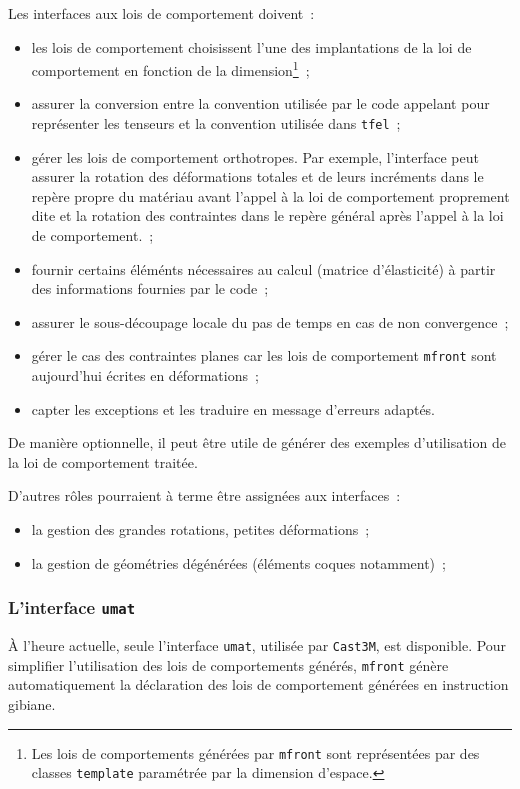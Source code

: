 \documentclass[rectoverso,pleiades,pstricks,leqno,anti]{texmf/note_technique_2010}
\newcommand{\tfel}{\texttt{tfel}}
\newcommand{\mfront}{\texttt{mfront}}
\newcommand{\castem}{\texttt{Cast3M}}
\def\ifmonospace{\ifdim\fontdimen3\font=0pt }
\def\cpp{%
\ifmonospace%
    C++%
\else%
    C\kern-.1667em\raise.30ex\hbox{\smaller{++}}%
\fi%
\spacefactor1000 }
\begin{document}
Les interfaces aux lois de comportement doivent~:
\begin{itemize}
  \item les lois de comportement choisissent l'une des implantations de
  la loi de comportement en fonction de la dimension\footnote{Les lois
    de comportements générées par \mfront{} sont représentées par des
    classes \texttt{template} paramétrée par la dimension d'espace.}~;
  \item assurer la conversion entre la convention utilisée par le code
  appelant pour représenter les tenseurs et la convention utilisée dans
  \tfel{}~;
  \item gérer les lois de comportement orthotropes. Par exemple,
  l'interface peut assurer la rotation des déformations totales et de
  leurs incréments dans le repère propre du matériau avant l'appel à la
  loi de comportement proprement dite et la rotation des contraintes
  dans le repère général après l'appel à la loi de comportement.~;
  \item fournir certains éléménts nécessaires au calcul (matrice
  d'élasticité) à partir des informations fournies par le code~;
  \item assurer le sous-découpage locale du pas de temps en cas de non
  convergence~;
  \item gérer le cas des contraintes planes car les lois de comportement
  \mfront{} sont aujourd'hui écrites en déformations~;
  \item capter les exceptions \cpp{} et les traduire en message
  d'erreurs adaptés.
\end{itemize}

De manière optionnelle, il peut être utile de générer des exemples
d'utilisation de la loi de comportement traitée.

D'autres rôles pourraient à terme être assignées aux interfaces~:
\begin{itemize}
\item la gestion des grandes rotations, petites déformations~;
\item la gestion de géométries dégénérées (éléments coques notamment)~;
\end{itemize}

\subsubsection{L'interface \texttt{umat}}

À l'heure actuelle, seule l'interface \texttt{umat}, utilisée par
\castem{}, est disponible. Pour simplifier l'utilisation des lois de
comportements générés, \mfront{} génère automatiquement la déclaration
des lois de comportement générées en instruction gibiane.
\end{document}
